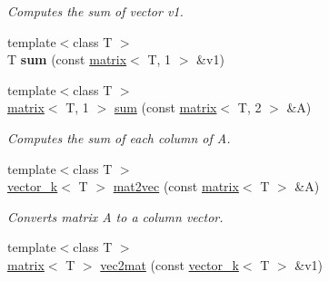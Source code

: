 \begin{DoxyCompactItemize}
\begin{DoxyCompactList}\small\item\em Computes the sum of vector v1. \end{DoxyCompactList}\item 
\hypertarget{namespacekeycpp_a1f2b77d5a0c3eb7c97254067015e843c}{{\footnotesize template$<$class T $>$ }\\T {\bfseries sum} (const \hyperlink{classkeycpp_1_1matrix}{matrix}$<$ T, 1 $>$ \&v1)}\label{namespacekeycpp_a1f2b77d5a0c3eb7c97254067015e843c}

\item 
\hypertarget{namespacekeycpp_a90f53f3dc1a16e2afc809f2510b35c00}{{\footnotesize template$<$class T $>$ }\\\hyperlink{classkeycpp_1_1matrix}{matrix}$<$ T, 1 $>$ \hyperlink{namespacekeycpp_a90f53f3dc1a16e2afc809f2510b35c00}{sum} (const \hyperlink{classkeycpp_1_1matrix}{matrix}$<$ T, 2 $>$ \&A)}\label{namespacekeycpp_a90f53f3dc1a16e2afc809f2510b35c00}

\begin{DoxyCompactList}\small\item\em Computes the sum of each column of A. \end{DoxyCompactList}\item 
\hypertarget{namespacekeycpp_a049d8e50ce9c2c5e0b7a0ad95cc559b3}{{\footnotesize template$<$class T $>$ }\\\hyperlink{classkeycpp_1_1vector__k}{vector\-\_\-k}$<$ T $>$ \hyperlink{namespacekeycpp_a049d8e50ce9c2c5e0b7a0ad95cc559b3}{mat2vec} (const \hyperlink{classkeycpp_1_1matrix}{matrix}$<$ T $>$ \&A)}\label{namespacekeycpp_a049d8e50ce9c2c5e0b7a0ad95cc559b3}

\begin{DoxyCompactList}\small\item\em Converts matrix A to a column vector. \end{DoxyCompactList}\item 
\hypertarget{namespacekeycpp_a6fb905e99ba06b2a005547e7f5d0f54f}{{\footnotesize template$<$class T $>$ }\\\hyperlink{classkeycpp_1_1matrix}{matrix}$<$ T $>$ \hyperlink{namespacekeycpp_a6fb905e99ba06b2a005547e7f5d0f54f}{vec2mat} (const \hyperlink{classkeycpp_1_1vector__k}{vector\-\_\-k}$<$ T $>$ \&v1)}\label{namespacekeycpp_a6fb905e99ba06b2a005547e7f5d0f54f}


\end{DoxyCompactItemize}
